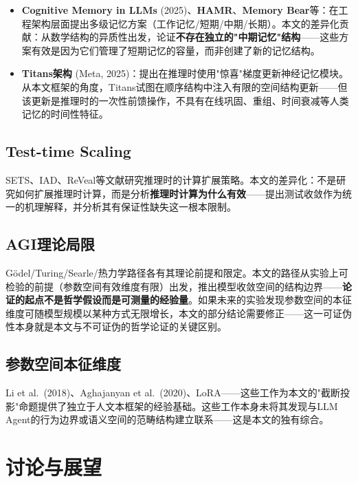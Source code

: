 \documentclass[11pt,a4paper]{ctexart}
\begin{document}
\begin{itemize}[leftmargin=*]
    \item \textbf{Cognitive Memory in LLMs} (2025)\cite{CognitiveMemory2025}、\textbf{HAMR}\cite{HAMR2025}、\textbf{Memory Bear}等：在工程架构层面提出多级记忆方案（工作记忆/短期/中期/长期）。本文的差异化贡献：从数学结构的异质性出发，论证\textbf{不存在独立的"中期记忆"结构}——这些方案有效是因为它们管理了短期记忆的容量，而非创建了新的记忆结构。
    \item \textbf{Titans架构} (Meta, 2025)：提出在推理时使用"惊喜"梯度更新神经记忆模块。从本文框架的角度，Titans试图在顺序结构中注入有限的空间结构更新——但该更新是推理时的一次性前馈操作，不具有在线巩固、重组、时间衰减等人类记忆的时间性特征。
\end{itemize}

\subsection{Test-time Scaling}

SETS、IAD、ReVeal等文献研究推理时的计算扩展策略。本文的差异化：不是研究如何扩展推理时计算，而是分析\textbf{推理时计算为什么有效}——提出测试收敛作为统一的机理解释，并分析其有保证性缺失这一根本限制。

\subsection{AGI理论局限}

G\"odel/Turing/Searle/热力学路径各有其理论前提和限定。本文的路径从实验上可检验的前提（参数空间有效维度有限）出发，推出模型收敛空间的结构边界——\textbf{论证的起点不是哲学假设而是可测量的经验量}。如果未来的实验发现参数空间的本征维度可随模型规模以某种方式无限增长，本文的部分结论需要修正——这一可证伪性本身就是本文与不可证伪的哲学论证的关键区别。

\subsection{参数空间本征维度}

Li et al.\ (2018)\cite{Li2018IntrinsicDim}、Aghajanyan et al.\ (2020)\cite{Aghajanyan2020}、LoRA\cite{Hu2021LoRA}——这些工作为本文的"截断投影"命题提供了独立于人文本框架的经验基础。这些工作本身未将其发现与LLM Agent的行为边界或语义空间的范畴结构建立联系——这是本文的独有综合。


\section{讨论与展望}
\end{document}
